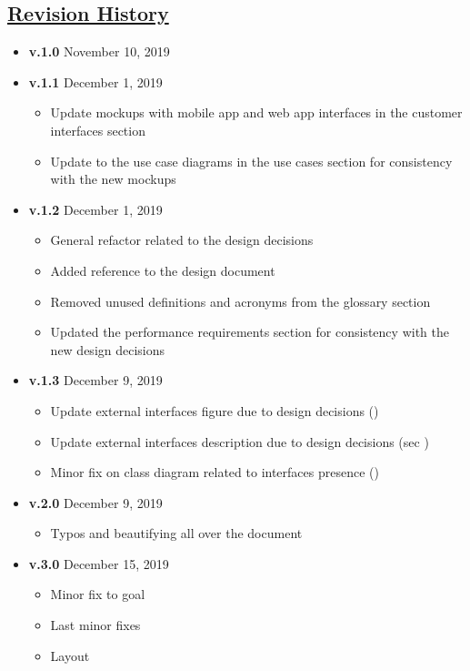 \begin{appendices}
	\section[Revision History]{\hyperlink{toc}{Revision History}}
		\label{sec:revisionHistory}
		
		\begin{itemize}
			\item \textbf{v.1.0} November 10, 2019
			\item \textbf{v.1.1} December 1, 2019
				\begin{itemize}
					\item Update mockups with mobile app and web app interfaces in the customer interfaces section 
					\item Update to the use case diagrams in the use cases section  for consistency with the new mockups
				\end{itemize}
			\item \textbf{v.1.2} December 1, 2019
				\begin{itemize}
					\item General refactor related to the design decisions
					\item Added reference to the design document \cite{DD}
					\item Removed unused definitions and acronyms from the glossary section 
					\item Updated the performance requirements section  for consistency with the new design decisions
				\end{itemize}
			\item \textbf{v.1.3} December 9, 2019
				\begin{itemize}
					\item Update external interfaces figure due to design decisions ()
					\item Update external interfaces description due to design decisions (sec )
					\item Minor fix on class diagram related to interfaces presence ()
				\end{itemize}
			\item \textbf{v.2.0} December 9, 2019
				\begin{itemize}
					\item Typos and beautifying all over the document 
				\end{itemize}
			\item \textbf{v.3.0} December 15, 2019
				\begin{itemize}
					\item Minor fix to goal 
					\item Last minor fixes
					\item Layout 
				\end{itemize}
		\end{itemize}
	

\end{appendices}
